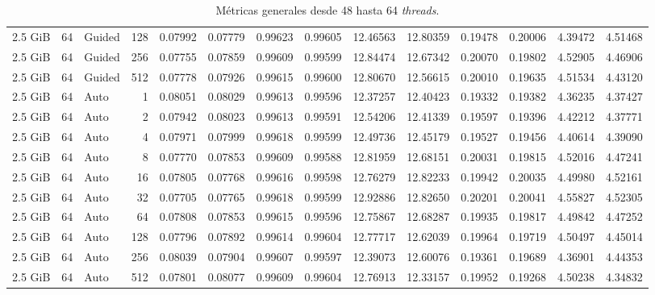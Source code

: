 \begin{table}[H]
\begin{adjustbox}{width=\textwidth, keepaspectratio}
\begin{tabular}{rrlrrrrrrrrrrr}
                    2.5 GiB & 64 & Guided & 128 & 0.07992 & 0.07779 & 0.99623 & 0.99605 & 12.46563 & 12.80359 & 0.19478 & 0.20006 & 4.39472 & 4.51468 \\
                    2.5 GiB & 64 & Guided & 256 & 0.07755 & 0.07859 & 0.99609 & 0.99599 & 12.84474 & 12.67342 & 0.20070 & 0.19802 & 4.52905 & 4.46906 \\
                    2.5 GiB & 64 & Guided & 512 & 0.07778 & 0.07926 & 0.99615 & 0.99600 & 12.80670 & 12.56615 & 0.20010 & 0.19635 & 4.51534 & 4.43120 \\
                    2.5 GiB & 64 & Auto & 1 & 0.08051 & 0.08029 & 0.99613 & 0.99596 & 12.37257 & 12.40423 & 0.19332 & 0.19382 & 4.36235 & 4.37427 \\
                    2.5 GiB & 64 & Auto & 2 & 0.07942 & 0.08023 & 0.99613 & 0.99591 & 12.54206 & 12.41339 & 0.19597 & 0.19396 & 4.42212 & 4.37771 \\
                    2.5 GiB & 64 & Auto & 4 & 0.07971 & 0.07999 & 0.99618 & 0.99599 & 12.49736 & 12.45179 & 0.19527 & 0.19456 & 4.40614 & 4.39090 \\
                    2.5 GiB & 64 & Auto & 8 & 0.07770 & 0.07853 & 0.99609 & 0.99588 & 12.81959 & 12.68151 & 0.20031 & 0.19815 & 4.52016 & 4.47241 \\
                    2.5 GiB & 64 & Auto & 16 & 0.07805 & 0.07768 & 0.99616 & 0.99598 & 12.76279 & 12.82233 & 0.19942 & 0.20035 & 4.49980 & 4.52161 \\
                    2.5 GiB & 64 & Auto & 32 & 0.07705 & 0.07765 & 0.99618 & 0.99599 & 12.92886 & 12.82650 & 0.20201 & 0.20041 & 4.55827 & 4.52305 \\
                    2.5 GiB & 64 & Auto & 64 & 0.07808 & 0.07853 & 0.99615 & 0.99596 & 12.75867 & 12.68287 & 0.19935 & 0.19817 & 4.49842 & 4.47252 \\
                    2.5 GiB & 64 & Auto & 128 & 0.07796 & 0.07892 & 0.99614 & 0.99604 & 12.77717 & 12.62039 & 0.19964 & 0.19719 & 4.50497 & 4.45014 \\
                    2.5 GiB & 64 & Auto & 256 & 0.08039 & 0.07904 & 0.99607 & 0.99597 & 12.39073 & 12.60076 & 0.19361 & 0.19689 & 4.36901 & 4.44353 \\
                    2.5 GiB & 64 & Auto & 512 & 0.07801 & 0.08077 & 0.99609 & 0.99604 & 12.76913 & 12.33157 & 0.19952 & 0.19268 & 4.50238 & 4.34832 \\
                    \bottomrule
                \end{tabular}
            \end{adjustbox}
            \caption{Métricas generales desde 48 hasta 64 \textit{threads}.}
            \label{tab:distance_metrics_4}
        \end{table}

